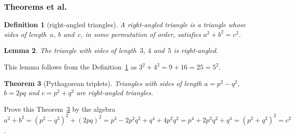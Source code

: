 \subsubsection{Theorems et al.}

\newtheorem{theorem}{Theorem}
\newtheorem{corollary}[theorem]{Corollary}
\newtheorem{lemma}[theorem]{Lemma}
\newtheorem{definition}[theorem]{Definition}

\begin{definition}[right-angled triangles] \label{def:tri}
	A \emph{right-angled triangle} is a triangle whose sides of length~\(a\), \(b\) and~\(c\), in some permutation of order, satisfies \(a^2+b^2=c^2\).
\end{definition}

\begin{lemma} 
	The triangle with sides of length~\(3\), \(4\) and~\(5\) is right-angled.
\end{lemma}

This lemma follows from the Definition~\ref{def:tri} as \(3^2+4^2=9+16=25=5^2\).

\begin{theorem}[Pythagorean triplets] \label{thm:py}
	Triangles with sides of length \(a=p^2-q^2\), \(b=2pq\) and \(c=p^2+q^2\) are right-angled triangles.
\end{theorem}

Prove this Theorem~\ref{thm:py} by the algebra \(a^2+b^2 =(p^2-q^2)^2+(2pq)^2
=p^4-2p^2q^2+q^4+4p^2q^2
=p^4+2p^2q^2+q^4
=(p^2+q^2)^2 =c^2\).




